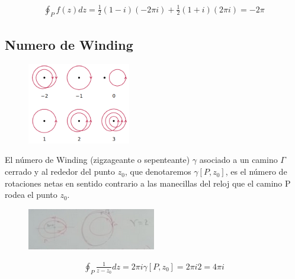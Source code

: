 \documentclass{article}
\begin{document}
\begin{gather*}
  \displaystyle\oint_{P }^{} f(z)dz = \frac{1}{2}(1 - i )(-2\pi i ) + \frac{1}{2}(1 + i )(2\pi i ) = - 2 \pi  
\end{gather*}

\subsection{Numero de Winding}

\begin{figure}[H]
  \begin{center}
    \includegraphics[width=0.4\textwidth]{numeros_winding.png}
  \end{center}
\end{figure}

El número de Winding (zigzageante o sepenteante) $ \gamma $ asociado a un camino $ \Gamma  $ cerrado y al rededor del punto $ z_0  $, que denotaremos $ \gamma[P,z_0 ] $, es el número de rotaciones netas en sentido contrario a las manecillas del reloj que el camino P rodea el punto $ z_0  $.
\begin{figure}[H]
  \begin{center}
    \includegraphics[width=0.5\textwidth]{numero_winding.png}
  \end{center}
\end{figure}
\begin{gather*}
  \displaystyle\oint_{P }^{} \frac{1}{z - z_0 }dz = 2\pi i \gamma[P,z_0 ] = 2\pi i 2 = 4\pi i 
\end{gather*}
\end{document}
